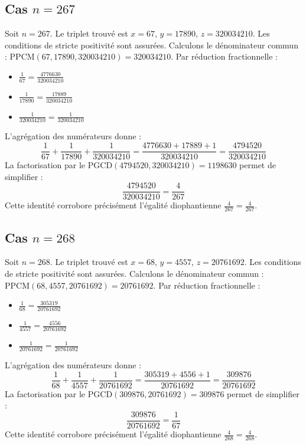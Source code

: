 \documentclass[11pt,a4paper]{article}
\begin{document}
\subsection{Cas $n = 267$}
Soit $n = 267$. Le triplet trouvé est $x = 67$, $y = 17890$, $z = 320034210$.
Les conditions de stricte positivité sont assurées.
Calculons le dénominateur commun : $\text{PPCM}(67, 17890, 320034210) = 320034210$.
Par réduction fractionnelle :
\begin{itemize}
    \item $\frac{1}{67} = \frac{4776630}{320034210}$
    \item $\frac{1}{17890} = \frac{17889}{320034210}$
    \item $\frac{1}{320034210} = \frac{1}{320034210}$
\end{itemize}
L'agrégation des numérateurs donne :
$$ \frac{1}{67} + \frac{1}{17890} + \frac{1}{320034210} = \frac{4776630 + 17889 + 1}{320034210} = \frac{4794520}{320034210} $$
La factorisation par le $\text{PGCD}(4794520, 320034210) = 1198630$ permet de simplifier :
$$ \frac{4794520}{320034210} = \frac{4}{267} $$
Cette identité corrobore précisément l'égalité diophantienne $\frac{4}{267} = \frac{4}{267}$.

\subsection{Cas $n = 268$}
Soit $n = 268$. Le triplet trouvé est $x = 68$, $y = 4557$, $z = 20761692$.
Les conditions de stricte positivité sont assurées.
Calculons le dénominateur commun : $\text{PPCM}(68, 4557, 20761692) = 20761692$.
Par réduction fractionnelle :
\begin{itemize}
    \item $\frac{1}{68} = \frac{305319}{20761692}$
    \item $\frac{1}{4557} = \frac{4556}{20761692}$
    \item $\frac{1}{20761692} = \frac{1}{20761692}$
\end{itemize}
L'agrégation des numérateurs donne :
$$ \frac{1}{68} + \frac{1}{4557} + \frac{1}{20761692} = \frac{305319 + 4556 + 1}{20761692} = \frac{309876}{20761692} $$
La factorisation par le $\text{PGCD}(309876, 20761692) = 309876$ permet de simplifier :
$$ \frac{309876}{20761692} = \frac{1}{67} $$
Cette identité corrobore précisément l'égalité diophantienne $\frac{4}{268} = \frac{4}{268}$.
\end{document}
